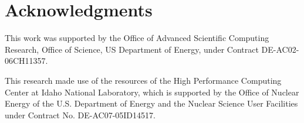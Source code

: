 \section*{Acknowledgments}

This work was supported by the Office of Advanced Scientific Computing Research, Office of Science, US Department of Energy, under Contract DE-AC02-06CH11357.

This research made use of the resources of the High Performance Computing Center at Idaho National Laboratory, which is supported by the Office of Nuclear Energy of the U.S. Department of Energy and the Nuclear Science User Facilities under Contract No. DE-AC07-05ID14517.
